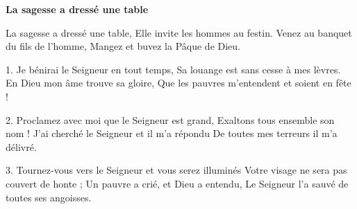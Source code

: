 \textbf{La sagesse a dressé une table}

La sagesse a dressé une table,
Elle invite les hommes au festin.
Venez au banquet du fils de l'homme,
Mangez et buvez la Pâque de Dieu.

1. Je bénirai le Seigneur en tout temps,
Sa louange est sans cesse à mes lèvres.
En Dieu mon âme trouve sa gloire,
Que les pauvres m'entendent et soient en fête !

2. Proclamez avec moi que le Seigneur est grand,
Exaltons tous ensemble son nom !
J'ai cherché le Seigneur et il m'a répondu
De toutes mes terreurs il m'a délivré.

3. Tournez-vous vers le Seigneur et vous serez illuminés
Votre visage ne sera pas couvert de honte ;
Un pauvre a crié, et Dieu a entendu,
Le Seigneur l'a sauvé de toutes ses angoisses.
